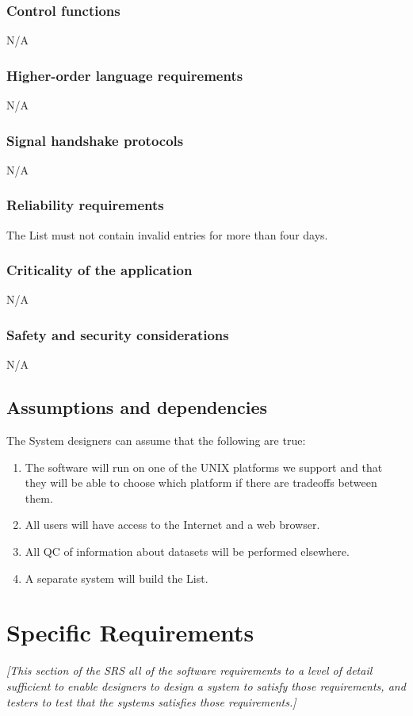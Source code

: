 \documentclass{article}
\begin{document}
\subsubsection{Control functions}
N/A 

\subsubsection{Higher-order language requirements}
N/A 

\subsubsection{Signal handshake protocols}
N/A 

\subsubsection{Reliability requirements}
The List must not contain invalid entries for more than four days.

\subsubsection{Criticality of the application}
N/A 

\subsubsection{Safety and security considerations}
N/A

\subsection{Assumptions and dependencies}
\label{sec:assumptions}
The System designers can assume that the following are true:
\begin{enumerate}
\item The software will run on one of the UNIX platforms we support and that
  they will be able to choose which platform if there are tradeoffs between
  them.
\item All users will have access to the Internet and a web browser.
\item All QC of information about datasets will be performed elsewhere.
\item A separate system will build the List.
\end{enumerate}

\section{Specific Requirements}
\label{sec:specific}
\emph{[This section of the \ac{SRS} all of the software requirements to a
  level of detail sufficient to enable designers to design a system to
  satisfy those requirements, and testers to test that the systems satisfies
  those requirements.]}
\end{document}
